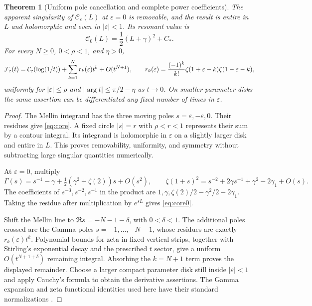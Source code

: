 \documentclass[11pt,a4paper]{article}
\numberwithin{equation}{section}
\newtheorem{theorem}{Theorem}[section]
\theoremstyle{definition}\newtheorem{definition}[theorem]{Definition}
\theoremstyle{remark}\newtheorem{remark}[theorem]{Remark}
\newcommand{\eps}{\varepsilon}
\newcommand{\F}{\mathcal F}\newcommand{\CC}{\mathcal C}
\begin{document}
\begin{theorem}[Uniform pole cancellation and complete power coefficients]
\label{thm:collision}
The apparent singularity of $\CC_\eps(L)$ at $\eps=0$ is removable,
and the result is entire in $L$ and holomorphic and even in $|\eps|<1$.
Its resonant value is
\begin{equation}\label{eq:core0}
 \CC_0(L)=\frac12(L+\gamma)^2+C_*.
\end{equation}
For every $N\ge0$, $0<\rho<1$, and $\eta>0$,
\begin{equation}\label{eq:asymptotic}
 \F_\eps(t)=\CC_\eps(\log(1/t))+
 \sum_{k=1}^{N}r_k(\eps)t^k+O(t^{N+1}),
 \qquad
 r_k(\eps)={(-1)^k\over k!}\zeta(1+\eps-k)\zeta(1-\eps-k),
\end{equation}
uniformly for $|\eps|\le\rho$ and
$|\arg t|\le\pi/2-\eta$ as $t\to0$. On smaller parameter disks the
same assertion can be differentiated any fixed number of times in
$\eps$.
\end{theorem}
\begin{proof}
The Mellin integrand has the three moving poles $s=\eps,-\eps,0$.
Their residues give \eqref{eq:core}. A fixed circle $|s|=r$ with
$\rho<r<1$ represents their sum by a contour integral. Its integrand is
holomorphic in $\eps$ on a slightly larger disk and entire in $L$.
This proves removability, uniformity, and symmetry without subtracting
large singular quantities numerically.

At $\eps=0$, multiply
\[
 \Gamma(s)=s^{-1}-\gamma+
 \tfrac12(\gamma^2+\zeta(2))s+O(s^2),\qquad
 \zeta(1+s)^2=s^{-2}+2\gamma s^{-1}+\gamma^2-2\gamma_1+O(s).
\]
The coefficients of $s^{-3},s^{-2},s^{-1}$ in the product are
$1,\gamma,\zeta(2)/2-\gamma^2/2-2\gamma_1$.
Taking the residue after multiplication by $e^{sL}$ gives
\eqref{eq:core0}.

Shift the Mellin line to $\Re s=-N-1-\delta$, with
$0<\delta<1$. The additional poles crossed are the Gamma poles
$s=-1,\ldots,-N-1$, whose residues are exactly $r_k(\eps)t^k$.
Polynomial bounds for zeta in fixed vertical strips, together with
Stirling's exponential decay and the prescribed $t$ sector, give a
uniform $O(t^{N+1+\delta})$ remaining integral. Absorbing the
$k=N+1$ term proves the displayed remainder. Choose a larger compact
parameter disk still inside $|\eps|<1$ and apply Cauchy's formula to
obtain the derivative assertions. The Gamma expansion and zeta
functional identities used here have their standard normalizations
\cite{DLMFgamma,DLMFzeta}.
\end{proof}
\end{document}
